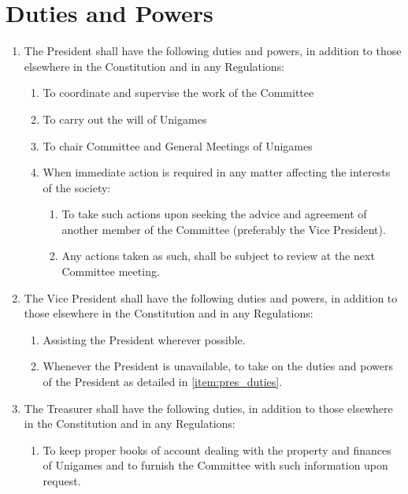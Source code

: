 \documentclass[a4paper]{article}
\begin{document}
\section{Duties and Powers} \label{sec:duties}
\begin{enumerate}
    \item The President shall have the following duties and powers, in addition to those elsewhere in the Constitution and in any Regulations: \label{item:pres_duties}
          \begin{enumerate}
              \item To coordinate and supervise the work of the Committee
              \item To carry out the will of Unigames
              \item To chair Committee and General Meetings of Unigames
              \item When immediate action is required in any matter affecting the interests of the society:
                    \begin{enumerate}
                        \item To take such actions upon seeking the advice and agreement of another member of the Committee (preferably the Vice President).
                        \item Any actions taken as such, shall be subject to review at the next Committee meeting.
                    \end{enumerate}
          \end{enumerate}
    \item The Vice President shall have the following duties and powers, in addition to those elsewhere in the Constitution and in any Regulations:
          \begin{enumerate}
              \item Assisting the President wherever possible.
              \item Whenever the President is unavailable, to take on the duties and powers of the President as detailed in \cref{item:pres_duties}.
          \end{enumerate}
    \item The Treasurer shall have the following duties, in addition to those elsewhere in the Constitution and in any Regulations:
          \begin{enumerate}
              \item To keep proper books of account dealing with the property and finances of Unigames and to furnish the Committee with such information upon request.

\end{enumerate}
\end{enumerate}
\end{document}
